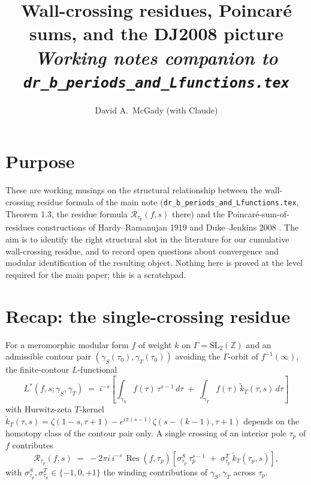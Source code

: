 \documentclass[11pt]{article}
\title{Wall-crossing residues, Poincar\'e sums, and the DJ2008 picture\\
\large\emph{Working notes companion to \texttt{dr\_b\_periods\_and\_Lfunctions.tex}}}
\author{David A.\ McGady (with Claude)}
\date{}
\newcommand{\ZZ}{\mathbb{Z}}
\newcommand{\SLZ}{\mathrm{SL}_2(\ZZ)}
\DeclareMathOperator{\Res}{Res}
\begin{document}
\maketitle

\section*{Purpose}

These are working musings on the structural relationship between the
wall-crossing residue formula of the main note
(\texttt{dr\_b\_periods\_and\_Lfunctions.tex}, Theorem 1.3,
the residue formula $\mathcal{R}_{\tau_p}(f, s)$ there) and the
Poincar\'e-sum-of-residues
constructions of Hardy--Ramanujan 1919 \cite{HR1919} and Duke--Jenkins
2008 \cite{DJ2008}.  The aim is to identify the right structural slot
in the literature for our cumulative wall-crossing residue, and to
record open questions about convergence and modular identification of
the resulting object.  Nothing here is proved at the level required
for the main paper; this is a scratchpad.

\section{Recap: the single-crossing residue}

For a meromorphic modular form $f$ of weight $k$ on $\Gamma = \SLZ$
and an admissible contour pair $(\gamma_S(\tau_0), \gamma_T(\tau_0))$
avoiding the $\Gamma$-orbit of $f^{-1}(\infty)$, the finite-contour
$L$-functional
\begin{equation}\label{eq:Lstar-def}
  L^*(f, s; \gamma_S, \gamma_T)
  \;=\; i^{-s}\!\left[
    \int_{\gamma_S}\! f(\tau)\,\tau^{s - 1}\,d\tau
    \;+\;
    \int_{\gamma_T}\! f(\tau)\,\widetilde{k}_T(\tau, s)\,d\tau
  \right]
\end{equation}
with Hurwitz-zeta $T$-kernel $\widetilde{k}_T(\tau, s) = \zeta(1-s,
\tau+1) - e^{i\pi(s-1)}\zeta(s-(k-1), \tau+1)$ depends on the homotopy
class of the contour pair only.  A single crossing of an interior
pole $\tau_p$ of $f$ contributes
\begin{equation}\label{eq:single-residue}
  \mathcal{R}_{\tau_p}(f, s)
  \;=\; -2\pi i\,i^{-s}\,\Res(f, \tau_p)\!
  \left[\sigma^S_{\tau_p}\,\tau_p^{s - 1}
  \;+\; \sigma^T_{\tau_p}\,\widetilde{k}_T(\tau_p, s)\right],
\end{equation}
with $\sigma^S_{\tau_p}, \sigma^T_{\tau_p} \in \{-1, 0, +1\}$ the
winding contributions of $\gamma_S, \gamma_T$ across $\tau_p$.
\end{document}
